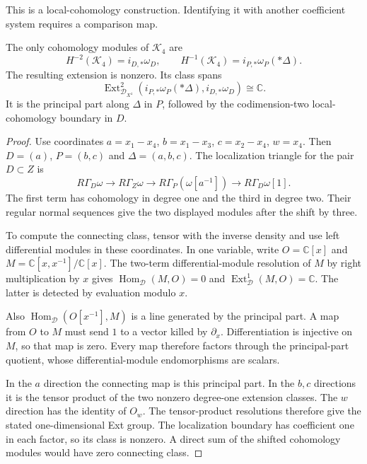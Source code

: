 This is a local-cohomology construction. Identifying it
with another coefficient system requires a comparison map.

\begin{proposition}\label{mht:prop:four-position-attachment}
The only cohomology modules of $\mathcal K_4$ are
\[
 H^{-2}(\mathcal K_4)=i_{D,*}\omega_D,
 \qquad
 H^{-1}(\mathcal K_4)=i_{P,*}\omega_P(*\Delta).
\]
The resulting extension is nonzero. Its class spans
\[
 \operatorname{Ext}^2_{\mathcal D_{X^4}}
       (i_{P,*}\omega_P(*\Delta),i_{D,*}\omega_D)
       \cong\mathbb C.
\]
It is the principal part along $\Delta$ in $P$, followed
by the codimension-two local-cohomology boundary in $D$.
\end{proposition}
\begin{proof}
Use coordinates $a=x_1-x_4$, $b=x_1-x_3$,
$c=x_2-x_4$, $w=x_4$. Then $D=(a)$, $P=(b,c)$
and $\Delta=(a,b,c)$. The localization triangle for the
pair $D\subset Z$ is
\[
 R\Gamma_D\omega\longrightarrow R\Gamma_Z\omega
 \longrightarrow R\Gamma_P(\omega[a^{-1}])
 \longrightarrow R\Gamma_D\omega[1].
\]
The first term has cohomology in degree one and the third
in degree two. Their regular normal sequences give the
two displayed modules after the shift by three.

To compute the connecting class, tensor with the inverse
density and use left differential modules in these coordinates.
In one variable, write $O=\mathbb C[x]$ and
$M=\mathbb C[x,x^{-1}]/\mathbb C[x]$.
The two-term differential-module resolution of $M$ by
right multiplication by $x$ gives
$\operatorname{Hom}_{\mathcal D}(M,O)=0$ and
$\operatorname{Ext}^1_{\mathcal D}(M,O)=\mathbb C$.
The latter is detected by evaluation modulo $x$.

Also $\operatorname{Hom}_{\mathcal D}(O[x^{-1}],M)$
is a line generated by the principal part. A map from
$O$ to $M$ must send $1$ to a vector killed by
$\partial_x$. Differentiation is injective on $M$, so
that map is zero. Every map therefore factors through
the principal-part quotient, whose differential-module
endomorphisms are scalars.

In the $a$ direction the connecting map is this principal
part. In the $b,c$ directions it is the tensor product
of the two nonzero degree-one extension classes.
The $w$ direction has the identity of $O_w$.
The tensor-product resolutions therefore give the stated
one-dimensional Ext group. The localization boundary
has coefficient one in each factor, so its class is nonzero.
A direct sum of the shifted cohomology modules would
have zero connecting class.
\end{proof}

